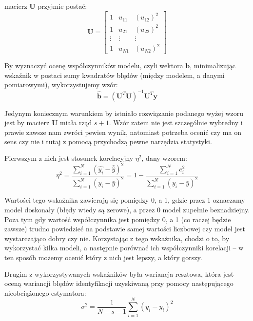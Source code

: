 \documentclass[11pt, a4paper]{article}
\begin{document}
macierz $\mathbf{U}$ przyjmie postać:
\begin{equation}
	\mathbf{U} =
		\begin{bmatrix}
		1 & u_{11} & (u_{12})^2 \\
		1 & u_{21} & (u_{22})^2 \\
		\vdots & \vdots & \vdots \\
		1 & u_{N1} & (u_{N2})^2
		\end{bmatrix}
\end{equation}

By wyznaczyć ocenę współczynników modelu, czyli wektora $\mathbf{b}$, minimalizując wskaźnik w postaci sumy kwadratów błędów (między modelem, a danymi pomiarowymi), wykorzystujemy wzór:
\begin{equation}
	\hat{\mathbf{b}} =
	\left( \mathbf{U}^T \mathbf{U} \right)^{-1}
	\mathbf{U}^T \mathbf{y}
\end{equation}

Jedynym koniecznym warunkiem by istniało rozwiązanie podanego wyżej wzoru jest by macierz $\mathbf{U}$ miała rząd $s + 1$. Wzór zatem nie jest szczególnie wybredny i prawie zawsze nam zwróci pewien wynik, natomiast potrzeba ocenić czy ma on sens czy nie i tutaj z pomocą przychodzą pewne narzędzia statystyki.

Pierwszym z nich jest stosunek korelacyjny $\eta^2$, dany wzorem:
\begin{equation}
	\eta^2 =
	\frac{\sum_{i=1}^{N} ( \hat{y_i} - \bar{\hat{y}} )^2}
	{\sum_{i=1}^{N} ( y_i - \bar{y} )^2} = 
	1 - \frac{\sum_{i=1}^{N} e_i^2}
	{\sum_{i=1}^{N} ( y_i - \bar{y} )^2}
	\label{eq:eta}
\end{equation}

Wartości tego wskaźnika zawierają się pomiędzy 0, a 1, gdzie przez 1 oznaczamy model doskonały (błędy wtedy są zerowe), a przez 0 model zupełnie beznadziejny. Poza tym gdy wartość współczynnika jest pomiędzy 0, a 1 (co raczej będzie zawsze) trudno powiedzieć na podstawie samej wartości liczbowej czy model jest wystarczająco dobry czy nie. Korzystając z tego wskaźnika, chodzi o to, by wykorzystać kilka modeli, a następnie porównać ich współczynniki korelacji -- w ten sposób możemy ocenić który z nich jest lepszy, a który gorszy.

Drugim z wykorzystywanych wskaźników była wariancja resztowa, która jest oceną wariancji błędów identyfikacji uzyskiwaną przy pomocy następującego nieobciążonego estymatora:
\begin{equation}
	\sigma^2 =
	\frac{1}{N - s - 1}
	\sum^{N}_{i=1} \left( y_i - \hat{y_i} \right)^2
\end{equation}
\end{document}
